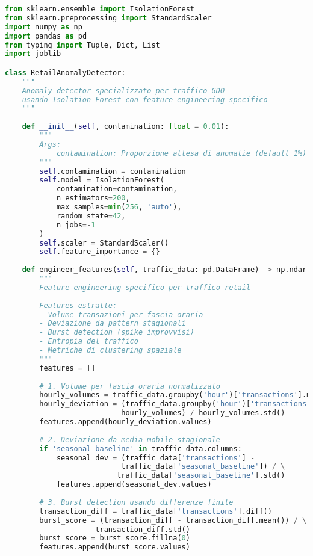 \begin{lstlisting}[language=Python, caption=Isolation Forest per Anomaly Detection GDO]
from sklearn.ensemble import IsolationForest
from sklearn.preprocessing import StandardScaler
import numpy as np
import pandas as pd
from typing import Tuple, Dict, List
import joblib

class RetailAnomalyDetector:
    """
    Anomaly detector specializzato per traffico GDO
    usando Isolation Forest con feature engineering specifico
    """
    
    def __init__(self, contamination: float = 0.01):
        """
        Args:
            contamination: Proporzione attesa di anomalie (default 1%)
        """
        self.contamination = contamination
        self.model = IsolationForest(
            contamination=contamination,
            n_estimators=200,
            max_samples=min(256, 'auto'),
            random_state=42,
            n_jobs=-1
        )
        self.scaler = StandardScaler()
        self.feature_importance = {}
    
    def engineer_features(self, traffic_data: pd.DataFrame) -> np.ndarray:
        """
        Feature engineering specifico per traffico retail
        
        Features estratte:
        - Volume transazioni per fascia oraria
        - Deviazione da pattern stagionali
        - Burst detection (spike improvvisi)
        - Entropia del traffico
        - Metriche di clustering spaziale
        """
        features = []
        
        # 1. Volume per fascia oraria normalizzato
        hourly_volumes = traffic_data.groupby('hour')['transactions'].mean()
        hourly_deviation = (traffic_data.groupby('hour')['transactions'].sum() - 
                           hourly_volumes) / hourly_volumes.std()
        features.append(hourly_deviation.values)
        
        # 2. Deviazione da media mobile stagionale
        if 'seasonal_baseline' in traffic_data.columns:
            seasonal_dev = (traffic_data['transactions'] - 
                           traffic_data['seasonal_baseline']) / \
                          traffic_data['seasonal_baseline'].std()
            features.append(seasonal_dev.values)
        
        # 3. Burst detection usando differenze finite
        transaction_diff = traffic_data['transactions'].diff()
        burst_score = (transaction_diff - transaction_diff.mean()) / \
                     transaction_diff.std()
        burst_score = burst_score.fillna(0)
        features.append(burst_score.values)
        

\end{lstlisting}
